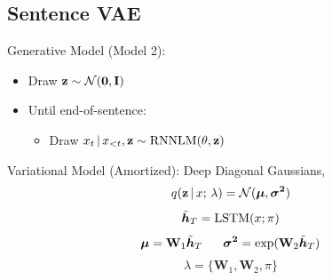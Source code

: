 
\subsection{Sentence VAE}
\begin{frame}
Generative Model (Model 2):
\begin{itemize}
    \item Draw $\mathbf{z} \sim \mathcal{N}(\mathbf{0}, \mathbf{I})$
    \item Until end-of-sentence:
    \begin{itemize}
    \item Draw $x_{t} \,|\, x_{<t}, \mathbf{z} \sim \operatorname*{RNNLM}( \theta, \mathbf{z})$
    \end{itemize}
\end{itemize}

Variational Model (Amortized): Deep Diagonal Gaussians, 
\[ q(\mathbf{z} \,|\, x ; \, \lambda ) = \mathcal{N}(\boldsymbol{\mu}, \boldsymbol{\sigma^2}) \]
\[ \tilde{\boldsymbol{h}}_T = \operatorname*{LSTM}(x; \pi) \]
\[ \boldsymbol{\mu} = \mathbf{W}_1\tilde{\boldsymbol{h}}_T \,\,\,\,\,\,\,\,\,\, \boldsymbol{\sigma^2} = \exp(\mathbf{W}_2 \tilde{\boldsymbol{h}}_T)\]
\[ \lambda = \{\mathbf{W}_1, \mathbf{W}_2, \pi\}\]
\end{frame}


